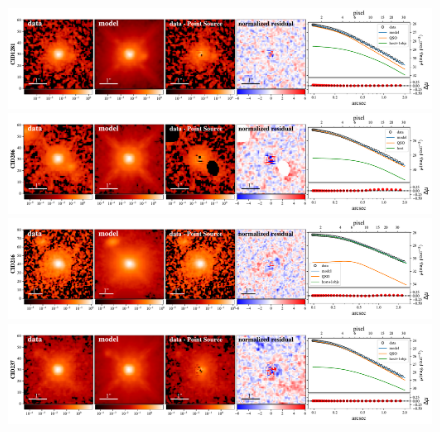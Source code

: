 \documentclass[apj]{emulateapj}
\begin{document}
\begin{figure}[ht]
\centering
{
\includegraphics[height=0.25\textwidth]{fig/best_fit_CID1281_SB_profile.pdf}
\includegraphics[height=0.25\textwidth]{fig/best_fit_CID206_SB_profile.pdf}
\includegraphics[height=0.25\textwidth]{fig/best_fit_CID216_SB_profile.pdf}
\includegraphics[height=0.25\textwidth]{fig/best_fit_CID237_SB_profile.pdf}
}
\end{figure} 
\end{document}
